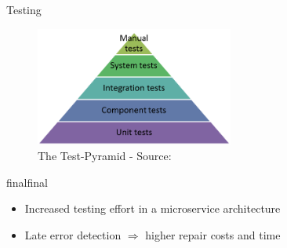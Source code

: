 \documentclass{beamer}
\def\final{final}
\def\status{final}
\begin{document}
\begin{frame}{}
  \vspace{-0.5cm}
  \begin{center}
    \Large Testing
  \end{center}

  \vspace{-0.5cm}
  \begin{figure}
    \includegraphics[width=0.58\textwidth]{img/tests-pyramid.png}
    \caption{\footnotesize The Test-Pyramid - \textcolor{uos-grey-full}{Source: {\cite{microtest}}}}
  \end{figure}
  \vspace{-0.2cm}

  \ifx\status\final{}
    \pause{}
  \fi


  \begin{block}{}
    \begin{itemize}
      \small
      \setlength\itemsep{0em}
      \item Increased testing effort in a microservice architecture
      \item Late error detection \(\Rightarrow \) higher repair costs and time
    \end{itemize}
  \end{block}
\end{frame}
\end{document}
